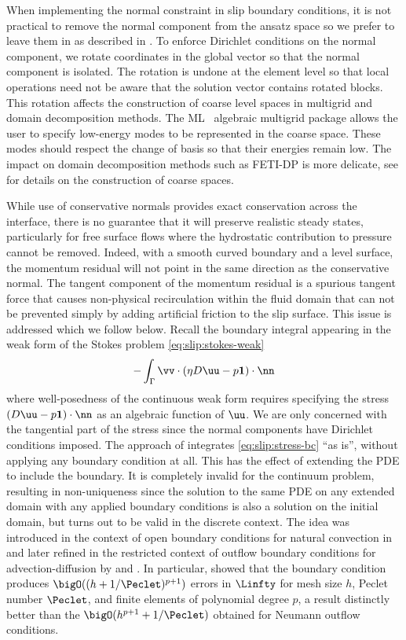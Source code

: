 When implementing the normal constraint in slip boundary conditions, it is not practical to remove the normal component from the ansatz space so we prefer to leave them in as described in .
To enforce Dirichlet conditions on the normal component, we rotate coordinates in the global vector so that the normal component is isolated.
The rotation is undone at the element level so that local operations need not be aware that the solution vector contains rotated blocks.
This rotation affects the construction of coarse level spaces in multigrid and domain decomposition methods.
The ML~\cite{ml-guide} algebraic multigrid package allows the user to specify low-energy modes to be represented in the coarse space.
These modes should respect the change of basis so that their energies remain low.
The impact on domain decomposition methods such as FETI-DP is more delicate, see \cite{klawonn2007robust,klawonn2006dual,dohrmann2010hybrid} for details on the construction of coarse spaces.

While use of conservative normals provides exact conservation across the interface, there is no guarantee that it will preserve realistic steady states, particularly for free surface flows where the hydrostatic contribution to pressure cannot be removed.
Indeed, with a smooth curved boundary and a level surface, the momentum residual will not point in the same direction as the conservative normal.
The tangent component of the momentum residual is a spurious tangent force that causes non-physical recirculation within the fluid domain that can not be prevented simply by adding artificial friction to the slip surface.
This issue is addressed \cite{behr2004application} which we follow below.
Recall the boundary integral appearing in the weak form of the Stokes problem \eqref{eq:slip:stokes-weak}
\begin{equation}\label{eq:slip:stress-bc}
  - \int_\Gamma \vv\cdot (\eta D\uu - p\bm 1)\cdot\nn
\end{equation}
where well-posedness of the continuous weak form requires specifying the stress $(D\uu - p\bm 1)\cdot\nn$ as an algebraic function of $\uu$.
We are only concerned with the tangential part of the stress since the normal components have Dirichlet conditions imposed.
The approach of \cite{behr2004application} integrates \eqref{eq:slip:stress-bc} ``as is'', without applying any boundary condition at all.
This has the effect of extending the PDE to include the boundary.
It is completely invalid for the continuum problem, resulting in non-uniqueness since the solution to the same PDE on any extended domain with any applied boundary conditions is also a solution on the initial domain, but turns out to be valid in the discrete context.
The idea was introduced in the context of open boundary conditions for natural convection in \cite{papanastasiou1992nob} and later refined 
in the restricted context of outflow boundary conditions for advection-diffusion by \cite{griffiths1997nbc} and \cite{renardy1997inb}.
In particular, \cite{griffiths1997nbc} showed that the boundary condition produces $\bigO((h+1/\Peclet)^{p+1})$ errors in $\Linfty$ for mesh size $h$, Peclet number $\Peclet$, and finite elements of polynomial degree $p$, a result distinctly better than the $\bigO(h^{p+1} + 1/\Peclet)$ obtained for Neumann outflow conditions.
